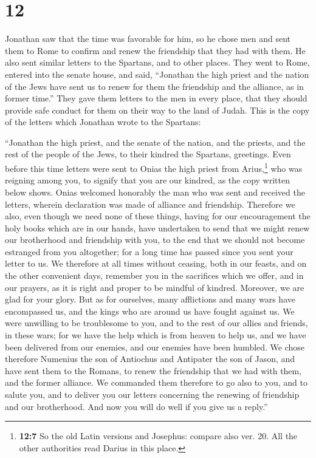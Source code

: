 \hypertarget{section-11}{%
\section{12}\label{section-11}}

 Jonathan saw that the time was favorable for him, so he
chose men and sent them to Rome to confirm and renew the friendship that
they had with them.  He also sent similar letters to the
Spartans, and to other places.  They went to Rome, entered
into the senate house, and said, ``Jonathan the high priest and the
nation of the Jews have sent us to renew for them the friendship and the
alliance, as in former time.''  They gave them letters to
the men in every place, that they should provide safe conduct for them
on their way to the land of Judah.  This is the copy of
the letters which Jonathan wrote to the Spartans:

 ``Jonathan the high priest, and the senate of the nation,
and the priests, and the rest of the people of the Jews, to their
kindred the Spartans, greetings.  Even before this time
letters were sent to Onias the high priest from Arius,\footnote{\textbf{12:7}
  So the old Latin versions and Josephus: compare also ver. 20. All the
  other authorities read Darius in this place.} who was reigning among
you, to signify that you are our kindred, as the copy written below
shows.  Onias welcomed honorably the man who was sent and
received the letters, wherein declaration was made of alliance and
friendship.  Therefore we also, even though we need none
of these things, having for our encouragement the holy books which are
in our hands,  have undertaken to send that we might
renew our brotherhood and friendship with you, to the end that we should
not become estranged from you altogether; for a long time has passed
since you sent your letter to us.  We therefore at all
times without ceasing, both in our feasts, and on the other convenient
days, remember you in the sacrifices which we offer, and in our prayers,
as it is right and proper to be mindful of kindred. 
Moreover, we are glad for your glory.  But as for
ourselves, many afflictions and many wars have encompassed us, and the
kings who are around us have fought against us.  We were
unwilling to be troublesome to you, and to the rest of our allies and
friends, in these wars;  for we have the help which is
from heaven to help us, and we have been delivered from our enemies, and
our enemies have been humbled.  We chose therefore
Numenius the son of Antiochus and Antipater the son of Jason, and have
sent them to the Romans, to renew the friendship that we had with them,
and the former alliance.  We commanded them therefore to
go also to you, and to salute you, and to deliver you our letters
concerning the renewing of friendship and our brotherhood.
 And now you will do well if you give us a reply.''

